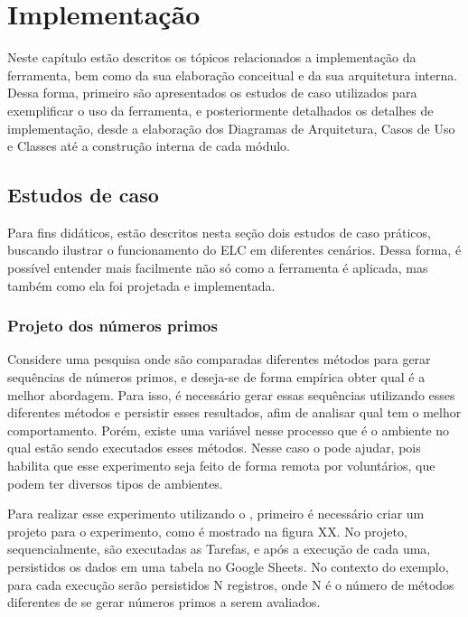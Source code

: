 \documentclass[12pt]{tcc}
\begin{document}
\chapter{Implementação}
\label{cap:implementação}

Neste capítulo estão descritos os tópicos relacionados a implementação da ferramenta, bem como da sua elaboração conceitual e da sua arquitetura interna. Dessa forma, primeiro são apresentados os estudos de caso utilizados para exemplificar o uso da ferramenta, e posteriormente detalhados os detalhes de implementação, desde a elaboração dos Diagramas de Arquitetura, Casos de Uso e Classes até a construção interna de cada módulo.

\section{Estudos de caso}

Para fins didáticos, estão descritos nesta seção dois estudos de caso práticos, buscando ilustrar o funcionamento do ELC em diferentes cenários. Dessa forma, é possível entender mais facilmente não só como a ferramenta é aplicada, mas também como ela foi projetada e implementada.

\subsection{Projeto dos números primos}

Considere uma pesquisa onde são comparadas diferentes métodos para gerar sequências de números primos, e deseja-se de forma empírica obter qual é a melhor abordagem. Para isso, é necessário gerar essas sequências utilizando esses diferentes métodos e persistir esses resultados, afim de analisar qual tem o melhor comportamento. Porém, existe uma variável nesse processo que é o ambiente no qual estão sendo executados esses métodos. Nesse caso o  pode ajudar, pois habilita que esse experimento seja feito de forma remota por voluntários, que podem ter diversos tipos de ambientes. 

Para realizar esse experimento utilizando o , primeiro é necessário criar um projeto para o experimento, como é mostrado na figura XX. No projeto, sequencialmente, são executadas as Tarefas, e após a execução de cada uma, persistidos os dados em uma tabela no Google Sheets. No contexto do exemplo, para cada execução serão persistidos N registros, onde N é o número de métodos diferentes de se gerar números primos a serem avaliados.
\end{document}
